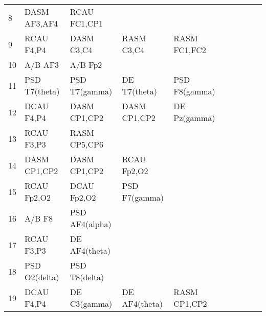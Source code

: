 \begin{landscape}
\begin{table}[]
\begin{tabular}{l|llllllll}
8        & DASM AF3,AF4   & RCAU FC1,CP1   &                &                &                &                &               &                &               &               \\
9        & RCAU F4,P4     & DASM C3,C4     & RASM C3,C4     & RASM FC1,FC2   &                &                &               &                &               &               \\
10       & A/B AF3        & A/B Fp2        &                &                &                &                &               &                &               &               \\
11       & PSD T7(theta)  & PSD T7(gamma)  & DE T7(theta)   & PSD F8(gamma)  &                &                &               &                &               &               \\
12       & DCAU F4,P4     & DASM CP1,CP2   & DASM CP1,CP2   & DE Pz(gamma)   &                &                &               &                &               &               \\
13       & RCAU F3,P3     & RASM CP5,CP6   &                &                &                &                &               &                &               &               \\
14       & DASM CP1,CP2   & DASM CP1,CP2   & RCAU Fp2,O2    &                &                &                &               &                &               &               \\
15       & RCAU Fp2,O2    & DCAU Fp2,O2    & PSD F7(gamma)  &                &                &                &               &                &               &               \\
16       & A/B F8         & PSD AF4(alpha) &                &                &                &                &               &                &               &               \\
17       & RCAU F3,P3     & DE AF4(theta)  &                &                &                &                &               &                &               &               \\
18       & PSD O2(delta)  & PSD T8(delta)  &                &                &                &                &               &                &               &               \\
19       & DCAU F4,P4     & DE C3(gamma)   & DE AF4(theta)  & RASM CP1,CP2   &                &                &               &                &               &               \\

\end{tabular}
\end{table}
\end{landscape}
